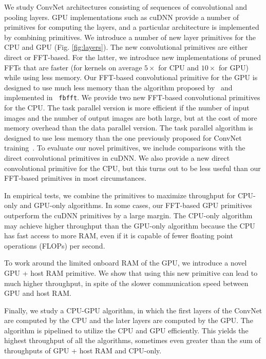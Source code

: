 \documentclass[conference]{./IEEEtran/IEEEtran}
\begin{document}
  We study ConvNet architectures consisting of sequences of
  convolutional and pooling layers.  GPU implementations such as cuDNN
  provide a number of primitives for computing the layers, and a
  particular architecture is implemented by combining primitives.  We
  introduce a number of new layer primitives for the CPU and GPU
  (Fig. \ref{fig:layers}). The new convolutional primitives are either
  direct or FFT-based.  For the latter, we introduce new
  implementations of pruned FFTs that are faster (for kernels on
  average $5\times$ for CPU and $10\times$ for GPU) while using less
  memory.  Our FFT-based convolutional primitive for the GPU is
  designed to use much less memory than the algorithm proposed
  by~\cite{mathieu-iclr-14,vasilache2014fast} and implemented in {\tt
  fbfft}.  We provide two new FFT-based convolutional primitives for
  the CPU. The task parallel version is more efficient if the number
  of input images and the number of output images are both large, but
  at the cost of more memory overhead than the data parallel version.
  The task parallel algorithm is designed to use less memory than the
  one previously proposed for ConvNet training~\cite{zlateski2015znn}.
  To evaluate our novel primitives, we include comparisons with the
  direct convolutional primitives in cuDNN.  We also provide a new
  direct convolutional primitive for the CPU, but this turns out to be
  less useful than our FFT-based primitives in most circumstances.

  In empirical tests, we combine the primitives to maximize throughput
  for CPU-only and GPU-only algorithms. In some cases, our FFT-based
  GPU primitives outperform the cuDNN primitives by a large margin.
  The CPU-only algorithm may achieve higher throughput than the
  GPU-only algorithm because the CPU has fast access to more RAM, even
  if it is capable of fewer floating point operations (FLOPs) per
  second.

To work around the limited onboard RAM of the GPU, we introduce a
novel GPU + host RAM primitive.  We show that using this new primitive
can lead to much higher throughput, in spite of the slower
communication speed between GPU and host RAM.

Finally, we study a CPU-GPU algorithm, in which the first layers of
the ConvNet are computed by the CPU and the later layers are computed
by the GPU.  The algorithm is pipelined to utilize the CPU and GPU
efficiently.  This yields the highest throughput of all the
algorithms, sometimes even greater than the sum of throughputs of GPU +
host RAM and CPU-only.
\end{document}
